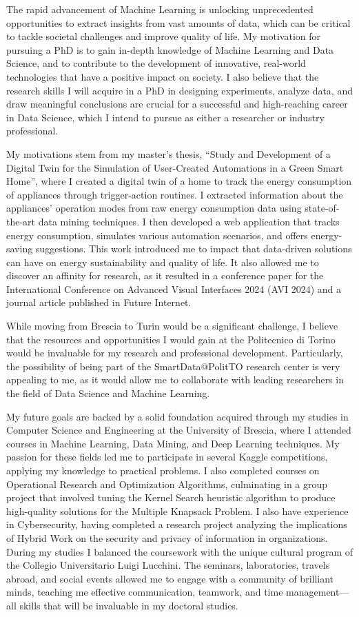 The rapid advancement of Machine Learning is unlocking unprecedented opportunities to extract insights from vast amounts of data, which can be critical to tackle societal challenges and improve quality of life. My motivation for pursuing a PhD is to gain in-depth knowledge of Machine Learning and Data Science, and to contribute to the development of innovative, real-world technologies that have a positive impact on society. I also believe that the research skills I will acquire in a PhD in designing experiments, analyze data, and draw meaningful conclusions are crucial for a successful and high-reaching career in Data Science, which I intend to pursue as either a researcher or industry professional.

My motivations stem from my master's thesis, ``Study and Development of a Digital Twin for the Simulation of User-Created Automations in a Green Smart Home'', where I created a digital twin of a home to track the energy consumption of appliances through trigger-action routines. I extracted information about the appliances' operation modes from raw energy consumption data using state-of-the-art data mining techniques. I then developed a web application that tracks energy consumption, simulates various automation scenarios, and offers energy-saving suggestions. This work introduced me to impact that data-driven solutions can have on energy sustainability and quality of life. It also allowed me to discover an affinity for research, as it resulted in a conference paper for the International Conference on Advanced Visual Interfaces 2024 (AVI 2024) and a journal article published in Future Internet.

While moving from Brescia to Turin would be a significant challenge, I believe that the resources and opportunities I would gain at the Politecnico di Torino would be invaluable for my research and professional development. Particularly, the possibility of being part of the SmartData@PolitTO research center is very appealing to me, as it would allow me to collaborate with leading researchers in the field of Data Science and Machine Learning. 

My future goals are backed by a solid foundation acquired through my studies in Computer Science and Engineering at the University of Brescia, where I attended courses in Machine Learning, Data Mining, and Deep Learning techniques. My passion for these fields led me to participate in several Kaggle competitions, applying my knowledge to practical problems. I also completed courses on Operational Research and Optimization Algorithms, culminating in a group project that involved tuning the Kernel Search heuristic algorithm to produce high-quality solutions for the Multiple Knapsack Problem. I also have experience in Cybersecurity, having completed a research project analyzing the implications of Hybrid Work on the security and privacy of information in organizations. During my studies I balanced the coursework with the unique cultural program of the Collegio Universitario Luigi Lucchini. The seminars, laboratories, travels abroad, and social events allowed me to engage with a community of brilliant minds, teaching me effective communication, teamwork, and time management---all skills that will be invaluable in my doctoral studies.

